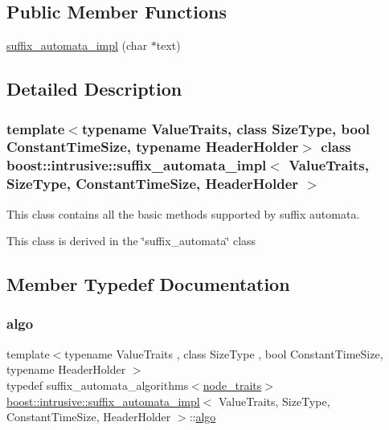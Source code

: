 \subsection*{Public Member Functions}
\begin{DoxyCompactItemize}
\item 
\hyperlink{classboost_1_1intrusive_1_1suffix__automata__impl_af726049e346e9b927b3ef5b4b4cf1ca4}{suffix\+\_\+automata\+\_\+impl} (char $\ast$text)
\end{DoxyCompactItemize}


\subsection{Detailed Description}
\subsubsection*{template$<$typename Value\+Traits, class Size\+Type, bool Constant\+Time\+Size, typename Header\+Holder$>$\newline
class boost\+::intrusive\+::suffix\+\_\+automata\+\_\+impl$<$ Value\+Traits, Size\+Type, Constant\+Time\+Size, Header\+Holder $>$}


\begin{DoxyItemize}
\item This class contains all the basic methods supported by suffix automata.  
\item This class is derived in the \char`\"{}suffix\+\_\+automata\char`\"{} class  
\end{DoxyItemize}

\subsection{Member Typedef Documentation}
\mbox{\label{classboost_1_1intrusive_1_1suffix__automata__impl_afa6f98d48851586ded5a3141789336d7}} 
\subsubsection{\texorpdfstring{algo}{algo}}
{\footnotesize\ttfamily template$<$typename Value\+Traits , class Size\+Type , bool Constant\+Time\+Size, typename Header\+Holder $>$ \\
typedef suffix\+\_\+automata\+\_\+algorithms$<$\hyperlink{classboost_1_1intrusive_1_1suffix__automata__impl_a3bf4d50a1aa7e13e6d6ded62d04a0296}{node\+\_\+traits}$>$ \hyperlink{classboost_1_1intrusive_1_1suffix__automata__impl}{boost\+::intrusive\+::suffix\+\_\+automata\+\_\+impl}$<$ Value\+Traits, Size\+Type, Constant\+Time\+Size, Header\+Holder $>$\+::\hyperlink{classboost_1_1intrusive_1_1suffix__automata__impl_afa6f98d48851586ded5a3141789336d7}{algo}}

